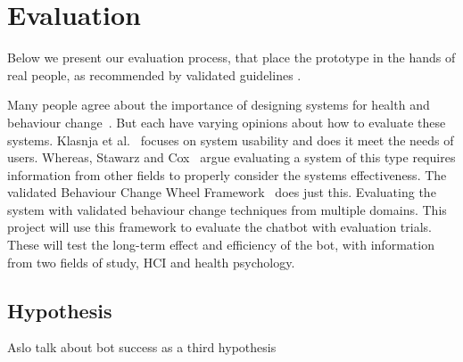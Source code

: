 
\newpage
\section{Evaluation}
Below we present our evaluation process, that place the prototype in the hands of real people, as recommended by validated guidelines \cite{article_mhealth, how_to_evaluate_tech_for_behaviour_change}.

Many people agree about the importance of designing systems for health and behaviour
change~\cite{article_mhealth, article_designing_for_healthy_lifestyles, article_designing_for_health_behaviour_change_hci}.
But each have varying opinions about how to evaluate these systems. Klasnja et al.~\cite{article_evaluate_tech_health_behaviour_change} focuses on system usability and does it meet the needs of users.
Whereas, Stawarz and Cox~\cite{article_designing_for_health_behaviour_change_hci} argue evaluating a system of this type requires information from other fields
to properly consider the systems effectiveness. The validated Behaviour Change Wheel Framework~\cite{article_behaviour_change_wheel} does just this.
Evaluating the system with validated behaviour change techniques from multiple domains. This project will use this framework to evaluate the chatbot with evaluation trials.
These will test the long-term effect and efficiency of the bot, with information from two fields of study, HCI and health psychology.

\subsection{Hypothesis}

Aslo talk about bot success as a third hypothesis

